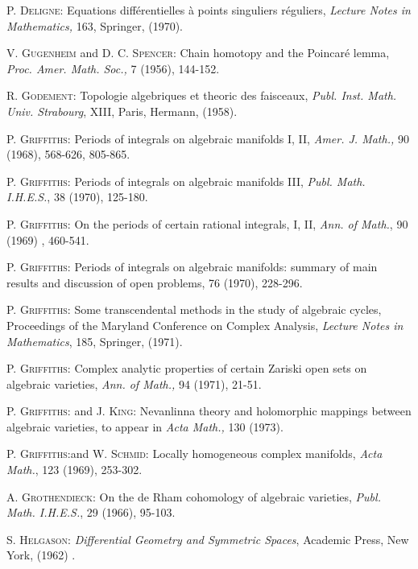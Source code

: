 \begin{thebibliography}{99}
 \textsc{P. Deligne}: Equations diff\'erentielles \`a points singuliers r\'eguliers, \textit{Lecture Notes in Mathematics,} 163, Springer, (1970).

 \textsc{V. Gugenheim} and \textsc{D. C. Spencer}: Chain homotopy and the Poincar\'e lemma, \textit{Proc. Amer. Math. Soc.,} 7 (1956), 144-152.

 \textsc{R. Godement}: Topologie algebriques et theoric des faisceaux, \textit{Publ. Inst. Math. Univ. Strabourg}, XIII, Paris, Hermann, (1958).

 \textsc{P. Griffiths}: Periods of integrals on algebraic manifolds I, II, \textit{Amer. J. Math.,} 90 (1968), 568-626, 805-865.

 \textsc{P. Griffiths}: Periods of integrals on algebraic manifolds III, \textit{Publ. Math. I.H.E.S.}, 38 (1970), 125-180.

 \textsc{P. Griffiths}: On the periods of certain rational integrals, I, II, \textit{Ann. of Math.}, 90 (1969) , 460-541.

 \textsc{P. Griffiths}: Periods of integrals on algebraic manifolds: summary of main results and discussion of open problems,  76 (1970), 228-296.

 \textsc{P. Griffiths}: Some transcendental methods in the study of algebraic cycles, Proceedings of the Maryland Conference on Complex Analysis, \textit{Lecture Notes in Mathematics}, 185, Springer, (1971).

 \textsc{P. Griffiths}: Complex analytic properties of certain Zariski open sets on algebraic varieties, \textit{Ann. of Math.,} 94 (1971), 21-51.

 \textsc{P. Griffiths}: and \textsc{J. King}: Nevanlinna theory and holomorphic mappings between algebraic varieties, to appear in \textit{Acta Math.,} 130 (1973).

 \textsc{P. Griffiths}:\pageoriginale and \textsc{W. Schmid}: Locally homogeneous complex manifolds, \textit{Acta Math.}, 123 (1969), 253-302.

 \textsc{A. Grothendieck}: On the de Rham cohomology of algebraic varieties, \textit{Publ. Math. I.H.E.S.}, 29 (1966), 95-103. 

 \textsc{S. Helgason}: \textit{Differential Geometry and Symmetric Spaces}, Academic Press, New York, (1962) .


\end{thebibliography}
